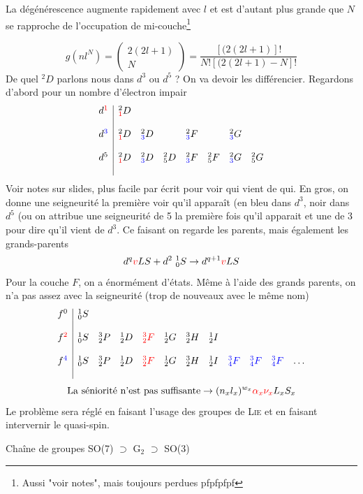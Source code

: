 \begin{center}
La dégénérescence augmente rapidement avec $l$ et est d'autant plus grande que $N$ se rapproche de l'occupation de mi-couche\footnote{Aussi "voir notes", mais toujours perdues pfpfpfpf}
\end{center}
\begin{equation}
g(nl^N) = 
  \left( \begin{array}{cc}  2(2l+1) \\ N \end{array} \right) 
= \frac{[(2(2l+1)]!}{N![(2(2l+1)-N]!}
\end{equation}
De quel $^2D$ parlons nous dans $d^3$ ou $d^5$ ? On va devoir les différencier. Regardons 
d'abord pour un nombre d'électron impair
$$\begin{array}{c|ccccccc}
d^{\color{red} 1}    & ^2_{\color{red} 1}D   &      &      &      &      &  &\\
&&&&&&& \\
d^{\color{blue} 3}   &   ^2_{\color{red} 1}D    &
 ^2_{\color{blue} 3}D   &        & ^2_{\color{blue} 3}F  &  
 &  ^2_{\color{blue} 3}G & \\ 
&&&&&&&\\
d^5  &  ^2_{\color{red} 1}D     & ^2_{\color{blue} 3}D    &
 ^2_5D  & ^2_{\color{blue} 3}F & 
^2_5F & ^2_{\color{blue} 3}G  & ^2_5G  \\
&&&&&&&\\
\end{array}$$
Voir notes sur slides, plus facile par écrit pour voir qui vient de qui. En gros, on donne
une seigneurité la première voir qu'il apparaît (en bleu dans $d^3$, noir dans $d^5$ (ou on
attribue une seigneurité de 5 la première fois qu'il apparait et une de 3 pour dire qu'il vient
de $d^3$. Ce faisant on regarde les parents, mais également les grands-parents
\begin{equation}
d^q {\color{red} v}LS +d^2\ _0^1S \rightarrow
d^{q+1}{\color{red} v}LS
\end{equation}
Pour la couche $F$, on a énormément d'états. Même à l'aide des grands parents, on n'a pas assez
avec la seigneurité (trop de nouveaux avec le même nom)
$$\begin{array}{c|cccccccccccccc}
f^0   & ^1_0S  &&&&&&&&&& \\
&&&&&&&&&&& \\
f^{\color{red} 2}    & ^1_0S&  ^3_2P  & ^1_2D & {\color{red} ^3_2F} & ^1_2G &
^3_2H & ^1_2I & & & &  \\   
&&&&&&&&&&& \\
f^{\color{blue} 4}    & ^1_0S&  ^3_2P  & ^1_2D & {\color{red} ^3_2F} & ^1_2G & 
^3_2H & ^1_2I  & {\color{blue} ^3_4F}& 
 {\color{blue} ^3_4F}&  {\color{blue} ^3_4F}&
 \ldots \\
&&&&&&&&&&& \\
\end{array}$$
$$\mbox{La s\'eniorit\'e n'est pas suffisante} \rightarrow
(n_x l_x) ^{w_x}  {\color{red} \alpha_x \nu_ x } L_x S_x$$
 Le problème sera réglé en faisant l'usage
des groupes de \textsc{Lie} et en faisant intervernir le quasi-spin.

\begin{center}
Chaîne de groupes SO(7) $\supset$ G$_2$ $\supset$ SO(3)
\end{center}
